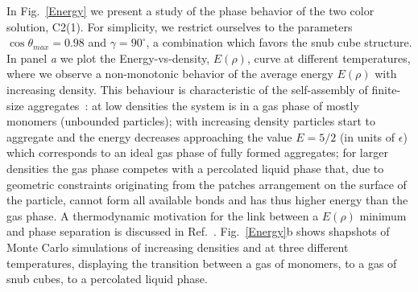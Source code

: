 \documentclass[a4paper, amsfonts, amssymb, amsmath, reprint, showkeys, nofootinbib, oneside]{revtex4-1}
\begin{document}
In Fig.~\ref{Energy} we present a study of the phase behavior of the two color solution, C2(1). For simplicity, we restrict ourselves to the parameters $\cos\theta_{max}=0.98$ and $\gamma=90^\circ$, a combination which favors the snub cube structure. In panel \emph{a} we plot the Energy-vs-density, $E(\rho)$, curve at different temperatures, where we observe a non-monotonic behavior of the average energy $E(\rho)$ with increasing density. This behaviour is characteristic of the self-assembly of finite-size aggregates~\cite{Sciortino2009}: at low densities the system is in a gas phase of mostly monomers (unbounded particles); with increasing density particles start to aggregate and the energy decreases approaching the value $E=5/2$ (in units of $\epsilon$) which corresponds to an ideal gas phase of fully formed aggregates; for larger densities the gas phase competes with a percolated liquid phase that, due to geometric constraints originating from the patches arrangement on the surface of the particle, cannot form all available bonds and has thus higher energy than the gas phase. A thermodynamic motivation for the link between a $E(\rho)$ minimum and phase separation is discussed in Ref.~\cite{Russo2021}. Fig.~\ref{Energy}b shows shapshots of Monte Carlo simulations of increasing densities and at three different temperatures, displaying the transition between a gas of monomers, to a gas of snub cubes, to a percolated liquid phase.



\end{document}
